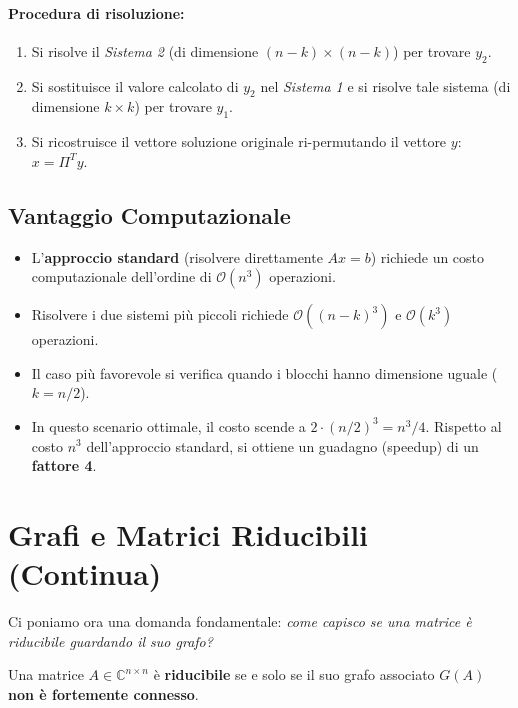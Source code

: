 \documentclass[a4paper,12pt]{article}
\begin{document}
	\paragraph{Procedura di risoluzione:}
	\begin{enumerate}
		\item Si risolve il \textit{Sistema 2} (di dimensione $(n-k) \times (n-k)$) per trovare $y_2$.
		\item Si sostituisce il valore calcolato di $y_2$ nel \textit{Sistema 1} e si risolve tale sistema (di dimensione $k \times k$) per trovare $y_1$.
		\item Si ricostruisce il vettore soluzione originale ri-permutando il vettore $y$: $x = \Pi^T y$.
	\end{enumerate}
	
	\subsection{Vantaggio Computazionale}
	\begin{itemize}
		\item L'\textbf{approccio standard} (risolvere direttamente $Ax=b$) richiede un costo computazionale dell'ordine di $\mathcal{O}(n^3)$ operazioni.
		\item Risolvere i due sistemi più piccoli richiede $\mathcal{O}((n-k)^3)$ e $\mathcal{O}(k^3)$ operazioni.
		\item Il caso più favorevole si verifica quando i blocchi hanno dimensione uguale ($k = n/2$).
		\item In questo scenario ottimale, il costo scende a $2 \cdot (n/2)^3 = n^3/4$. Rispetto al costo $n^3$ dell'approccio standard, si ottiene un guadagno (speedup) di un \textbf{fattore 4}.
	\end{itemize}
	\section{Grafi e Matrici Riducibili (Continua)}
	
	Ci poniamo ora una domanda fondamentale: \textit{come capisco se una matrice è riducibile guardando il suo grafo?}
	
	\begin{tcolorbox}[title=Teorema (Riducibilità e Grafi), colback=red!5!white, colframe=red!75!black]
		Una matrice $A \in \mathbb{C}^{n \times n}$ è \textbf{riducibile} se e solo se il suo grafo associato $G(A)$ \textbf{non è fortemente connesso}.
	\end{tcolorbox}
	
\end{document}
